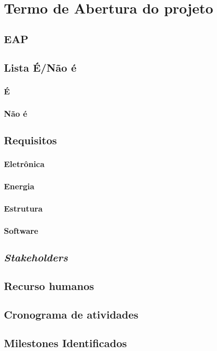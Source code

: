 \chapter{Termo de Abertura do projeto}

\section{EAP}
\section{Lista É/Não é}
\subsection{É}
\subsection{Não é}
\section{Requisitos}
\subsection{Eletrônica}
\subsection{Energia}
\subsection{Estrutura}
\subsection{Software}
\section{\emph{Stakeholders}}
\section{Recurso humanos}
\section{Cronograma de atividades}
\section{Milestones Identificados}
